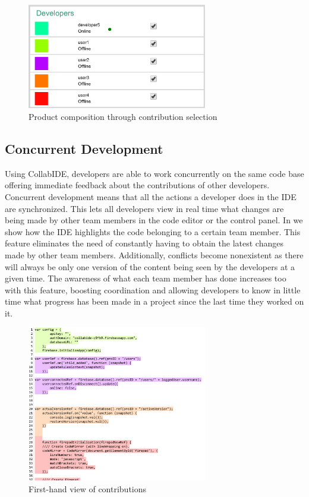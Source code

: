 \begin{figure}[htbp]
  \centering
  \includegraphics[width=0.7\textwidth]{img/fig3-collabIDEContributionManagement}
  \caption{Product composition through contribution selection}
  \label{fig:contribution}
\end{figure}


\subsection{Concurrent Development}
Using CollabIDE, developers are able to work concurrently on the same code base offering immediate feedback about the contributions of other developers.
Concurrent development means that all the actions a developer does in the IDE are synchronized. This lets all developers view in real time what changes are being made by other team members in the code editor or the control panel. In  we show how the IDE highlights the code belonging to a certain team member. This feature eliminates the need of constantly having to obtain the latest changes made by other team members. Additionally, conflicts become nonexistent as there will always be only one version of the content being seen by the developers at a given time. The awareness of what each team member has done increases too with this feature, boosting coordination and allowing developers to know in little time what progress has been made in a project since the last time they worked on it. 

\begin{figure}[htbp]
  \centering
  \includegraphics[width=0.7\textwidth]{img/fig2-collabIDEConcurrentProgramming}
  \caption{First-hand view of contributions}
  \label{fig:layers}
\end{figure}



